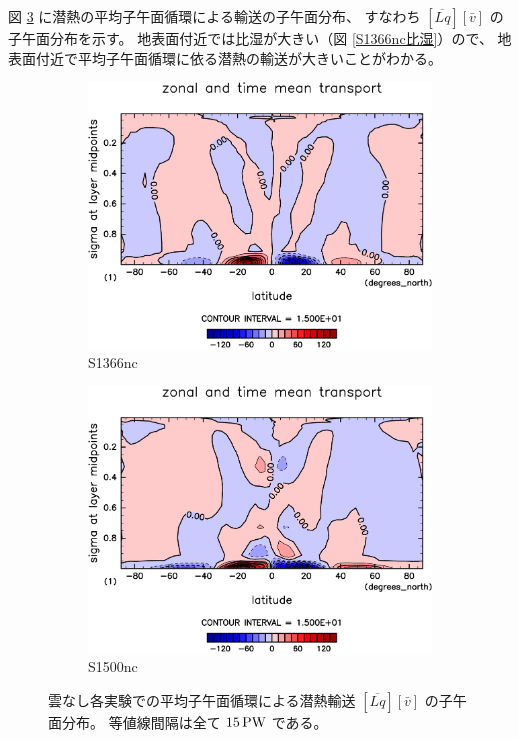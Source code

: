 \documentclass[body]{subfiles}
\begin{document}
図 \ref{潜熱平均子午面循環nc} に潜熱の平均子午面循環による輸送の子午面分布、
すなわち \([\overline{Lq}][\bar v]\) の子午面分布を示す。
地表面付近では比湿が大きい（図 \ref{S1366nc比湿}）ので、
地表面付近で平均子午面循環に依る潜熱の輸送が大きいことがわかる。

\begin{figure}[t]
	\centering
	\begin{subfigure}{.4\textwidth}
		\centering
		\includegraphics[width=\columnwidth]{S1366-nc/MeriHeatTransTest@latentEn_M,time=3650:4015-crop-rotate.pdf}
		\caption{S1366nc}\label{潜熱平均子午面循環S1366nc}
	\end{subfigure}
	\begin{subfigure}{.4\textwidth}
		\centering
		\includegraphics[width=\columnwidth]{S1500-nc/MeriHeatTransTest@latentEn_M,time=3650:4015-crop-rotate.pdf}
		\caption{S1500nc}\label{潜熱平均子午面循環S1500nc}
	\end{subfigure}
	\caption[雲なし各実験での平均子午面循環による潜熱輸送の子午面分布]{
		雲なし各実験での平均子午面循環による潜熱輸送 \([\overline{Lq}][\bar v]\) の子午面分布。
		等値線間隔は全て \(15\hmu{PW}\) である。
	}\label{潜熱平均子午面循環nc}
\end{figure}
\end{document}
